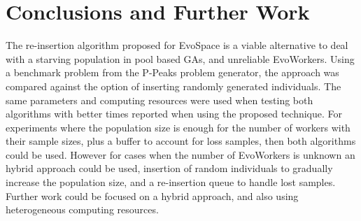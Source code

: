 \documentclass{llncs}
\begin{document}
\section{Conclusions and Further Work}
\label{sec:conclusions}

The re-insertion algorithm proposed for EvoSpace is a viable alternative
to deal with a starving population in pool based GAs, and unreliable EvoWorkers.
Using  a benchmark problem from the P-Peaks problem generator, 
the approach was compared against the option of inserting  
randomly generated individuals. The same parameters and computing resources
were used when testing both algorithms with better times reported when
using the proposed technique. For experiments where the population
size is enough for the number of workers with their sample sizes, plus a 
buffer to account for loss samples, then both algorithms could be used.
However for cases when the number of EvoWorkers is unknown an hybrid approach
could be used, insertion of random individuals to gradually increase the population
size, and a re-insertion queue to handle lost samples. Further work could be
focused on a hybrid approach, and also using heterogeneous computing resources. 


%

\begin{footnotesize}

\end{footnotesize}
\end{document}
